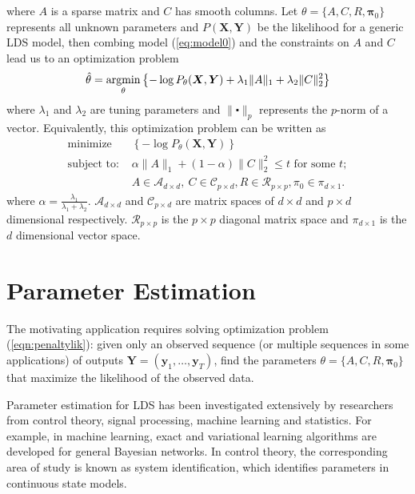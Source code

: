 \documentclass[fleqn]{article}
\let\oldref\ref
\renewcommand{\ref}[1]{(\oldref{#1})}
\newcommand{\argmin}{\operatornamewithlimits{argmin}}
\providecommand{\mb}[1]{\boldsymbol{#1}}
\newcommand{\by}{\mb{y}}
\newcommand{\bX}{\mb{X}}
\newcommand{\bY}{\mb{Y}}
\begin{document}
where $A$ is a sparse matrix and $C$ has smooth columns. 
Let $\theta =\{A,C,R,\mathbf{\pi}_0\}$ represents all unknown parameters and $P(\bX,\bY)$ be the likelihood for a generic LDS model, then combing model \ref{eq:model0} and the constraints on $A$ and $C$ lead us to an optimization problem
\begin{equation}\label{eqn:penaltylik}
\hat{\theta}=\argmin_{\substack{\theta}}\left\{-\log P_\theta(\bX,\bY)+\lambda_1\|A\|_1+\lambda_2\|C\|_2^2\right\}
\end{equation}
where $\lambda_1$ and $\lambda_2$ are tuning parameters and $\|\centerdot\|_p$ represents the $p$-norm of a vector. Equivalently, this optimization problem can be written as
\begin{equation}\label{eqn:penaltylikdual}
\begin{aligned}
&\text{minimize}&\left\{-\log P_\theta(\bX,\bY)\right\}&\\
&\text{subject to: }
& \alpha\|A\|_1+ (1-\alpha)\|C\|_2^2 \leq t \text{ for some }t; &\\
&& A\in \mathcal{A}_{d\times d},\ C \in \mathcal{C}_{p \times d}, R \in \mathcal{R}_{p\times p}, \pi_0 \in \mathcal{\pi}_{d\times 1}.&
\end{aligned}
\end{equation}
where $\alpha = \frac{\lambda_1}{\lambda_1 + \lambda_2}$. $\mathcal{A}_{d\times d}$ and $\mathcal{C}_{p \times d}$ are matrix spaces of $d\times d$ and $p \times d$ dimensional respectively. $\mathcal{R}_{p \times p}$ is the $p \times p$ diagonal matrix space and $\mathcal{\pi}_{d\times 1}$ is the $d$ dimensional vector space.
\section{Parameter Estimation}
The motivating application requires solving optimization problem \ref{eqn:penaltylik}: given only an observed sequence (or multiple sequences in some applications) of outputs $\bY=(\by_1,\ldots,\by_T)$, find the parameters $\theta=\{A,C,R,\mathbf{\pi}_0\}$ that maximize the likelihood of the observed data.

Parameter estimation for LDS has been investigated extensively by researchers from control theory, signal processing, machine learning and statistics. For example, in machine learning, exact and variational learning algorithms are developed for general Bayesian networks. In control theory, the corresponding area of study is known as system identification, which identifies parameters in continuous state models.
\end{document}
